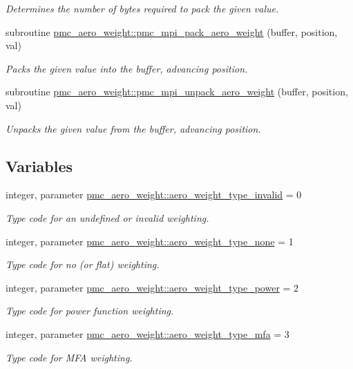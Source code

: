 \begin{DoxyCompactItemize}
\begin{DoxyCompactList}\small\item\em Determines the number of bytes required to pack the given value. \end{DoxyCompactList}\item 
subroutine \mbox{\hyperlink{namespacepmc__aero__weight_a953b171f04f27a0136788ebacd9471e8}{pmc\+\_\+aero\+\_\+weight\+::pmc\+\_\+mpi\+\_\+pack\+\_\+aero\+\_\+weight}} (buffer, position, val)
\begin{DoxyCompactList}\small\item\em Packs the given value into the buffer, advancing position. \end{DoxyCompactList}\item 
subroutine \mbox{\hyperlink{namespacepmc__aero__weight_a7fbba439d3f5e641d3a417e01e29ee64}{pmc\+\_\+aero\+\_\+weight\+::pmc\+\_\+mpi\+\_\+unpack\+\_\+aero\+\_\+weight}} (buffer, position, val)
\begin{DoxyCompactList}\small\item\em Unpacks the given value from the buffer, advancing position. \end{DoxyCompactList}\end{DoxyCompactItemize}
\subsection*{Variables}
\begin{DoxyCompactItemize}
\item 
integer, parameter \mbox{\hyperlink{namespacepmc__aero__weight_aec42d7fe52ae5751fedaa8c0c126d66d}{pmc\+\_\+aero\+\_\+weight\+::aero\+\_\+weight\+\_\+type\+\_\+invalid}} = 0
\begin{DoxyCompactList}\small\item\em Type code for an undefined or invalid weighting. \end{DoxyCompactList}\item 
integer, parameter \mbox{\hyperlink{namespacepmc__aero__weight_a8be5b5d0a97167c793448da8b88b7eb5}{pmc\+\_\+aero\+\_\+weight\+::aero\+\_\+weight\+\_\+type\+\_\+none}} = 1
\begin{DoxyCompactList}\small\item\em Type code for no (or flat) weighting. \end{DoxyCompactList}\item 
integer, parameter \mbox{\hyperlink{namespacepmc__aero__weight_a9ee33fc5875ba3405147a7fa0c2e90d9}{pmc\+\_\+aero\+\_\+weight\+::aero\+\_\+weight\+\_\+type\+\_\+power}} = 2
\begin{DoxyCompactList}\small\item\em Type code for power function weighting. \end{DoxyCompactList}\item 
integer, parameter \mbox{\hyperlink{namespacepmc__aero__weight_a8a21eb439339799883dbe622bfdf74d8}{pmc\+\_\+aero\+\_\+weight\+::aero\+\_\+weight\+\_\+type\+\_\+mfa}} = 3
\begin{DoxyCompactList}\small\item\em Type code for M\+FA weighting. \end{DoxyCompactList}\end{DoxyCompactItemize}


